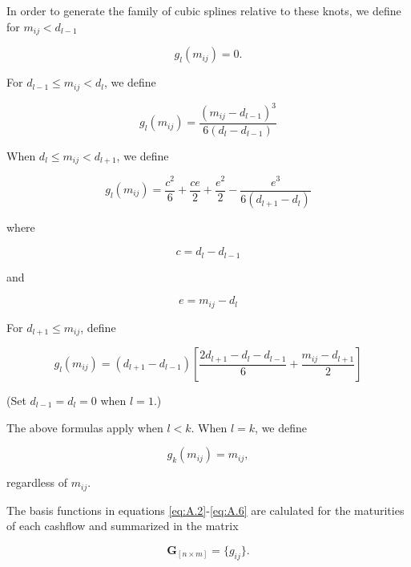 In order to generate the family of cubic splines relative to these knots, we define for $m_{ij}<d_{l-1}$

\begin{equation}
  \label{eq:A.2}
  g_l(m_{ij})=0.
\end{equation}


For $d_{l-1}\leq m_{ij} <d_l$, we define

\begin{equation}
  \label{eq:A.3}
  g_l(m_{ij})=\frac{(m_{ij}-d_{l-1})^3}{6(d_l-d_{l-1})}
\end{equation}

When $d_l\leq m_{ij}< d_{l+1}$, we define

\begin{equation}
  \label{eq:A.4a}
  g_l(m_{ij}) = \frac{c^2}{6}+\frac{ce}{2}+\frac{e^2}{2}-\frac{e^3}{6(d_{l+1}-d_l)}
\end{equation}

where

\begin{equation}
  \label{eq:A.4b}
  c = d_l-d_{l-1}
\end{equation}

and 

\begin{equation}
  \label{eq:A.4c}
  e = m_{ij}-d_l
\end{equation}

For $d_{l+1}\leq m_{ij}$, define

\begin{equation}
  \label{eq:A.5}
  g_l(m_{ij}) = (d_{l+1}-d_{l-1})\left[\frac{2d_{l+1}-d_l-d_{l-1}}{6}+\frac{m_{ij}-d_{l+1}}{2}\right]
\end{equation}

(Set $d_{l-1}=d_l=0$ when $l=1$.)

The above formulas apply when $l<k$. When $l=k$, we define

\begin{equation}
  \label{eq:A.6}
 g _k(m_{ij}) = m_{ij},
\end{equation}

regardless of $m_{ij}$.

The basis functions in equations \eqref{eq:A.2}-\eqref{eq:A.6} are calulated for the maturities of each cashflow and summarized in the matrix

\begin{equation}
\label{eq:basisfctmatrix}	
\bm{G}_{\left [n \times m\right]} = \{g_{ij}\}.
\end{equation}



